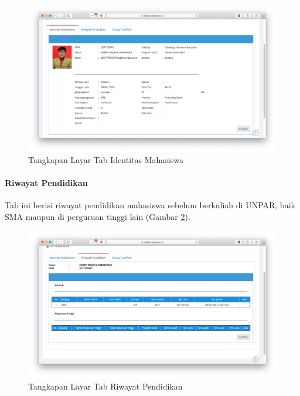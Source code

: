 \begin{figure}[H]
    \centering
    \includegraphics[scale=0.35]{Gambar/siakad_datadiri_identitasmahasiswa.png}
    \caption{Tangkapan Layar Tab Identitas Mahasiswa}
    \label{fig:3_siakad_datadiri_identitasmahasiswa}
\end{figure}

\paragraph{Riwayat Pendidikan} Tab ini berisi riwayat pendidikan mahasiswa sebelum berkuliah di UNPAR, baik SMA maupun di perguruan tinggi lain (Gambar \ref{fig:3_siakad_datadiri_riwayatpendidikan}).

\begin{figure}[H]
    \centering
    \includegraphics[scale=0.35]{Gambar/siakad_datadiri_riwayatpendidikan.png}
    \caption{Tangkapan Layar Tab Riwayat Pendidikan}
    \label{fig:3_siakad_datadiri_riwayatpendidikan}
\end{figure}

